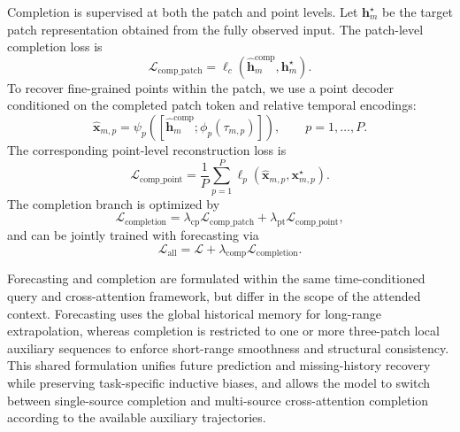 Completion is supervised at both the patch and point levels. Let $\bm{h}_m^{\star}$ be the target patch representation obtained from the fully observed input. The patch-level completion loss is
\begin{equation}
\mathcal{L}_{\mathrm{comp\_patch}}=\ell_c(\hat{\bm{h}}_m^{\mathrm{comp}},\bm{h}_m^{\star}).
\end{equation}
To recover fine-grained points within the patch, we use a point decoder conditioned on the completed patch token and relative temporal encodings:
\begin{equation}
\hat{\bm{x}}_{m,p}=\psi_p([\hat{\bm{h}}_m^{\mathrm{comp}};\phi_p(\tau_{m,p})]), \qquad p=1,\dots,P.
\end{equation}
The corresponding point-level reconstruction loss is
\begin{equation}
\mathcal{L}_{\mathrm{comp\_point}}=\frac{1}{P}\sum_{p=1}^{P}\ell_p(\hat{\bm{x}}_{m,p},\bm{x}_{m,p}^{\star}).
\end{equation}
The completion branch is optimized by
\begin{equation}
\mathcal{L}_{\mathrm{completion}}=
\lambda_{\mathrm{cp}}\mathcal{L}_{\mathrm{comp\_patch}}+
\lambda_{\mathrm{pt}}\mathcal{L}_{\mathrm{comp\_point}},
\end{equation}
and can be jointly trained with forecasting via
\begin{equation}
\mathcal{L}_{\mathrm{all}}=\mathcal{L}+\lambda_{\mathrm{comp}}\mathcal{L}_{\mathrm{completion}}.
\end{equation}

Forecasting and completion are formulated within the same time-conditioned query and cross-attention framework, but differ in the scope of the attended context. Forecasting uses the global historical memory for long-range extrapolation, whereas completion is restricted to one or more three-patch local auxiliary sequences to enforce short-range smoothness and structural consistency. This shared formulation unifies future prediction and missing-history recovery while preserving task-specific inductive biases, and allows the model to switch between single-source completion and multi-source cross-attention completion according to the available auxiliary trajectories.
